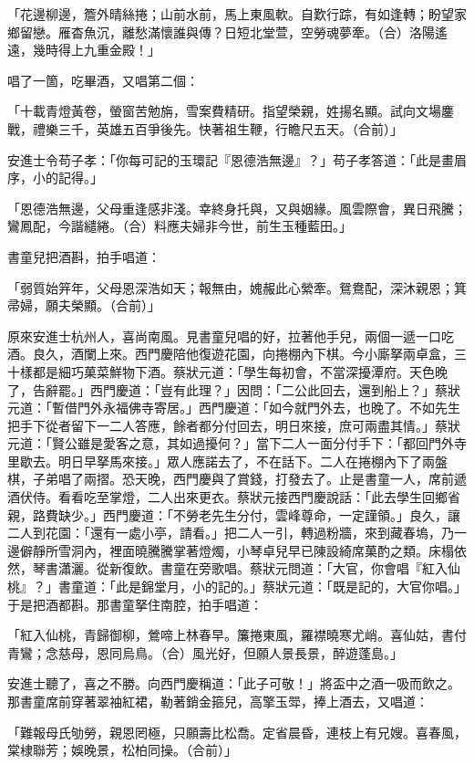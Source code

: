 「花邊柳邊，簷外晴絲捲；山前水前，馬上東風軟。自歎行踪，有如逢轉；盼望家鄉留戀。雁杳魚沉，離愁滿懷誰與傳？日短北堂萱，空勞魂夢牽。（合）洛陽遙遠，幾時得上九重金殿！」

唱了一箇，吃畢酒，又唱第二個：

「十載青燈黃卷，螢窗苦勉旃，雪案費精研。指望榮親，姓揚名顯。試向文場鏖戰，禮樂三千，英雄五百爭後先。快著祖生鞭，行瞻尺五天。（合前）」

安進士令苟子孝：「你每可記的玉環記『恩德浩無邊』？」苟子孝答道：「此是畫眉序，小的記得。」

「恩德浩無邊，父母重逢感非淺。幸終身托與，又與姻緣。風雲際會，異日飛騰；鸞鳳配，今諧繾綣。（合）料應夫婦非今世，前生玉種藍田。」

書童兒把酒斟，拍手唱道：

「弱質始笄年，父母恩深浩如天；報無由，媿赧此心縈牽。鴛鴦配，深沐親恩；箕帚婦，願夫榮顯。（合前）」

原來安進士杭州人，喜尚南風。見書童兒唱的好，拉著他手兒，兩個一遞一口吃酒。良久，酒闌上來。西門慶陪他復遊花園，向捲棚內下棋。今小廝拏兩卓盒，三十樣都是細巧菓菜鮮物下酒。蔡狀元道：「學生每初會，不當深擾潭府。天色晚了，告辭罷。」西門慶道：「豈有此理？」因問：「二公此回去，還到船上？」蔡狀元道：「暫借門外永福佛寺寄居。」西門慶道：「如今就門外去，也晚了。不如先生把手下從者留下一二人答應，餘者都分付回去，明日來接，庶可兩盡其情。」蔡狀元道：「賢公雖是愛客之意，其如過擾何？」當下二人一面分付手下：「都回門外寺里歇去。明日早拏馬來接。」眾人應諾去了，不在話下。二人在捲棚內下了兩盤棋，子弟唱了兩摺。恐天晚，西門慶與了賞錢，打發去了。止是書童一人，席前遞酒伏侍。看看吃至掌燈，二人出來更衣。蔡狀元接西門慶說話：「此去學生回鄉省親，路費缺少。」西門慶道：「不勞老先生分付，雲峰尊命，一定謹領。」良久，讓二人到花園：「還有一處小亭，請看。」把二人一引，轉過粉牆，來到藏春塢，乃一邊僻靜所雪洞內，裡面曉騰騰掌著燈燭，小琴卓兒早已陳設綺席菓酌之類。床榻依然，琴書瀟灑。從新復飲。書童在旁歌唱。蔡狀元問道：「大官，你會唱『紅入仙桃』？」書童道：「此是錦堂月，小的記的。」蔡狀元道：「既是記的，大官你唱。」于是把酒都斟。那書童拏住南腔，拍手唱道：

「紅入仙桃，青歸御柳，鶯啼上林春早。簾捲東風，羅襟曉寒尤峭。喜仙姑，書付青鸞；念慈母，恩同烏鳥。（合）風光好，但願人景長景，醉遊蓬島。」

安進士聽了，喜之不勝。向西門慶稱道：「此子可敬！」將盃中之酒一吸而飲之。那書童席前穿著翠袖紅裙，勒著銷金箍兒，高擎玉斝，捧上酒去，又唱道：

「難報母氏劬勞，親恩罔極，只願壽比松喬。定省晨昏，連枝上有兄嫂。喜春風，棠棣聯芳；娛晚景，松柏同操。（合前）」

